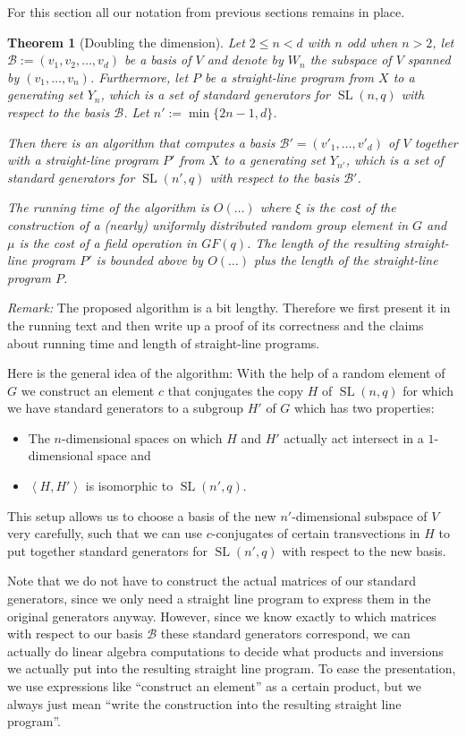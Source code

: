 \documentclass[a4paper,11pt]{article}
\def\SL{\operatorname{SL}}
\newcommand{\B}{\mathcal{B}}
\newtheorem{theorem}{Theorem}
\begin{document}
For this section all our notation from previous sections remains in place.

\begin{theorem}[Doubling the dimension]
\label{double}
Let $2 \le n < d$ with $n$ odd when $n > 2$, 
let $\B := (v_1, v_2, \ldots, v_d)$ be a basis of $V$
and denote by $W_n$ the subspace of $V$ spanned by $(v_1, \ldots, v_n)$. 
Furthermore, let $P$ be a straight-line program
from $X$ to a generating set $Y_n$, which is a set of standard
generators for $\SL(n,q)$ with respect to the basis $\B$.
Let $n' := \min\{ 2n-1, d\}$.

Then there is an algorithm that computes a basis $\B' = (v'_1, \ldots,
v'_d)$ of $V$ together with a straight-line program $P'$ from $X$
to a generating set $Y_{n'}$, which is a set of standard generators
for $\SL(n',q)$ with respect to the basis $\B'$.

The running time of the algorithm is $O(\ldots)$ where $\xi$ is the
cost of the construction of a (nearly) uniformly distributed random
group element in $G$ and $\mu$ is the cost of a field operation in
$GF(q)$. The length of the resulting straight-line program $P'$ is
bounded above by $O(\ldots)$ plus the length of the straight-line
program $P$.
\end{theorem}

\emph{Remark:} The proposed algorithm is a bit lengthy. Therefore
we first present it in the running text and then write up a proof of its
correctness and the claims about running time and length of
straight-line programs.

\smallskip
Here is the general idea of the algorithm: With the help of a random 
element of $G$ we construct an element $c$ that conjugates the copy $H$
of $\SL(n,q)$ for which we have standard generators to a subgroup $H'$ of
$G$ which has two properties:
\begin{itemize}
\item The $n$-dimensional spaces on which $H$ and $H'$ actually act 
intersect in a $1$-dimensional space and
\item $\left< H, H' \right>$ is isomorphic to $\SL(n',q)$.
\end{itemize}
This setup allows us to choose a basis of the new $n'$-dimensional
subspace of $V$ very carefully, such that we can use $c$-conjugates of certain
transvections in $H$ to put together standard generators for $\SL(n',q)$
with respect to the new basis. 

Note that we do not have to construct the actual matrices of our standard
generators, since we only need a straight line program to express them in the
original generators anyway. However, since we know exactly to which
matrices with respect to our basis $\B$ these standard generators correspond,
we can actually do linear algebra computations to decide what products
and inversions we actually put into the resulting straight line program.
To ease the presentation, we use expressions like ``construct an element''
as a certain product, but we always just mean ``write the construction
into the resulting straight line program''.
\end{document}
